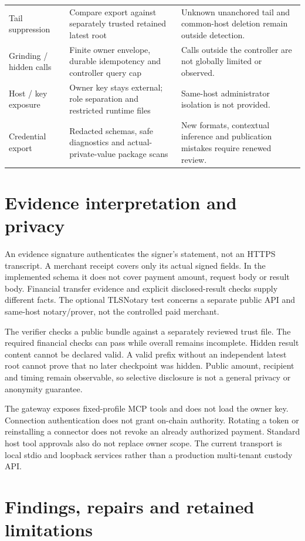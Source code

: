 \begin{longtable}{L{2.6cm}L{6.1cm}L{6cm}}
Tail suppression & Compare export against separately trusted retained latest root & Unknown unanchored tail and common-host deletion remain outside detection.\\
Grinding / hidden calls & Finite owner envelope, durable idempotency and controller query cap & Calls outside the controller are not globally limited or observed.\\
Host / key exposure & Owner key stays external; role separation and restricted runtime files & Same-host administrator isolation is not provided.\\
Credential export & Redacted schemas, safe diagnostics and actual-private-value package scans & New formats, contextual inference and publication mistakes require renewed review.\\\bottomrule
\end{longtable}

\section{Evidence interpretation and privacy}
An evidence signature authenticates the signer's statement, not an HTTPS transcript. A merchant receipt covers only its actual signed fields. In the implemented schema it does not cover payment amount, request body or result body. Financial transfer evidence and explicit disclosed-result checks supply different facts. The optional TLSNotary test concerns a separate public API and same-host notary/prover, not the controlled paid merchant.\citep{x402receipt,tlsnotary}

The verifier checks a public bundle against a separately reviewed trust file. The required financial checks can pass while overall remains incomplete. Hidden result content cannot be declared valid. A valid prefix without an independent latest root cannot prove that no later checkpoint was hidden. Public amount, recipient and timing remain observable, so selective disclosure is not a general privacy or anonymity guarantee.

The gateway exposes fixed-profile MCP tools and does not load the owner key. Connection authentication does not grant on-chain authority. Rotating a token or reinstalling a connector does not revoke an already authorized payment. Standard host tool approvals also do not replace owner scope. The current transport is local stdio and loopback services rather than a production multi-tenant custody API.\citep{mcp,implementation}

\section{Findings, repairs and retained limitations}
